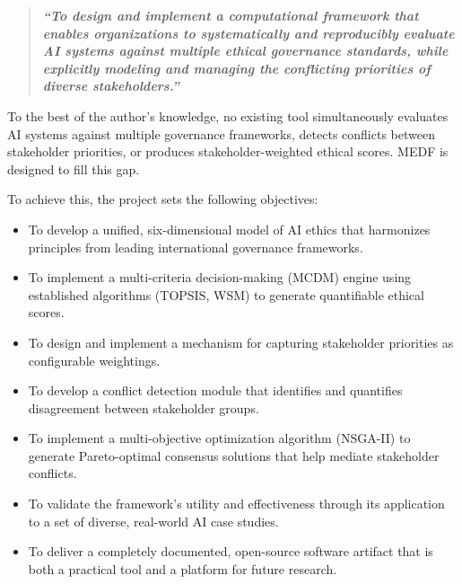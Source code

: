 \begin{quote}
{\bfseries\itshape``To design and implement a computational framework that enables organizations to systematically and reproducibly evaluate AI systems against multiple ethical governance standards, while explicitly modeling and managing the conflicting priorities of diverse stakeholders.''}
\end{quote}

To the best of the author's knowledge, no existing tool simultaneously evaluates AI systems against multiple governance frameworks, detects conflicts between stakeholder priorities, or produces stakeholder-weighted ethical scores. MEDF is designed to fill this gap.

To achieve this, the project sets the following objectives:

\begin{itemize}[leftmargin=2em]
  \item To develop a unified, six-dimensional model of AI ethics that harmonizes principles from leading international governance frameworks.
  \item To implement a multi-criteria decision-making (MCDM) engine using established algorithms (TOPSIS, WSM) to generate quantifiable ethical scores.
  \item To design and implement a mechanism for capturing stakeholder priorities as configurable weightings.
  \item To develop a conflict detection module that identifies and quantifies disagreement between stakeholder groups.
  \item To implement a multi-objective optimization algorithm (NSGA-II) to generate Pareto-optimal consensus solutions that help mediate stakeholder conflicts.
  \item To validate the framework's utility and effectiveness through its application to a set of diverse, real-world AI case studies.
  \item To deliver a completely documented, open-source software artifact that is both a practical tool and a platform for future research.
\end{itemize}
